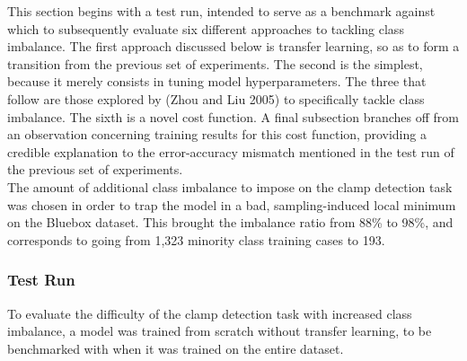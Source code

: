 \documentclass[a4paper,11pt]{article}
\begin{document}
This section begins with a test run, intended to serve as a benchmark against which to subsequently evaluate six different approaches to tackling class imbalance. The first approach discussed below is transfer learning, so as to form a transition from the previous set of experiments. The second is the simplest, because it merely consists in tuning model hyperparameters. The three that follow are those explored by (Zhou and Liu 2005) \cite{zhou} to specifically tackle class imbalance. The sixth is a novel cost function. A final subsection branches off from an observation concerning training results for this cost function, providing a credible explanation to the error-accuracy mismatch mentioned in the test run of the previous set of experiments. \\

The amount of additional class imbalance to impose on the clamp detection task was chosen in order to trap the model in a bad, sampling-induced local minimum on the Bluebox dataset. This brought the imbalance ratio from 88\% to 98\%, and corresponds to going from 1,323 minority class training cases to 193. \\

\subsubsection{Test Run}

To evaluate the difficulty of the clamp detection task with increased class imbalance, a model was trained from scratch without transfer learning, to be benchmarked with when it was trained on the entire dataset. 
\end{document}
